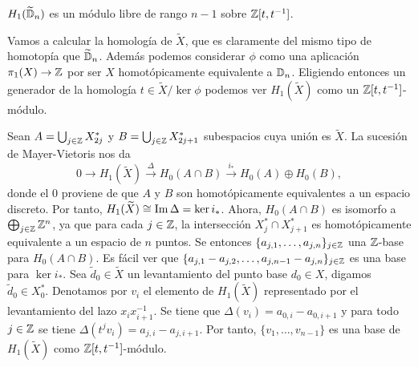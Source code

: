 \documentclass[TFG.tex]{subfiles}
\begin{document}
\begin{prop}\label{dimension}
$H_1(\widetilde{\mathbb{D}}_n)$ es un módulo libre de rango $n-1$ sobre $\mathbb{Z}[t,t^{-1}]$.
\end{prop}
\begin{dem}



Vamos a calcular la homología de $\widetilde{X}$, que es claramente del mismo tipo de homotopía que $\widetilde{\mathbb{D}}_n$. Además podemos considerar $\phi$ como una aplicación $\pi_1(X)\to\mathbb{Z}$ por ser $X$ homotópicamente equivalente a $\mathbb{D}_n$. Eligiendo entonces un generador de la homología $t\in \widetilde{X}/\ker\phi$ podemos ver $H_1(\widetilde{X})$ como un $\mathbb{Z}[t,t^{-1}]$-módulo. 

Sean $A=\bigcup_{j\in\mathbb{Z}}X_{2j}^*$ y $B=\bigcup_{j\in\mathbb{Z}}X_{2j+1}^*$ subespacios cuya unión es $\widetilde{X}$. La sucesión de Mayer-Vietoris nos da
\[
0\to H_1(\widetilde{X})\overset{\Delta}{\to} H_0(A\cap B)\overset{i_*}{\to} H_0(A)\oplus H_0(B),
\]
donde el 0 proviene de que $A$ y $B$ son homotópicamente equivalentes a un espacio discreto. Por tanto, $H_1(\widetilde{X})\cong \operatorname{Im}\Delta=\ker i_*$. Ahora, $H_0(A\cap B)$ es isomorfo a $\bigoplus_{j\in\mathbb{Z}}\mathbb{Z}^n$, ya que para cada $j\in\mathbb{Z}$, la intersección $X_j^*\cap X_{j+1}^*$ es homotópicamente equivalente a un espacio de $n$ puntos. Se entonces $\{a_{j,1},\dots, a_{j,n}\}_{j\in\mathbb{Z}}$ una $\mathbb{Z}$-base para $H_0(A\cap B)$. Es fácil ver que $\{a_{j,1}-a_{j,2},\dots,a_{j,n-1}-a_{j,n}\}_{j\in\mathbb{Z}}$ es una base para $\ker i_*$. Sea $\tilde{d}_0\in\widetilde{X}$ un levantamiento del punto base $d_0\in X$, digamos $\tilde{d}_0\in X_0^*$. Denotamos por $v_i$ el elemento de $H_1(\widetilde{X})$ representado por el levantamiento del lazo $x_ix_{i+1}^{-1}$. Se tiene que $\Delta (v_i)=a_{0,i}-a_{0,i+1}$ \cite{thesis} y para todo $j\in\mathbb{Z}$ se tiene $\Delta(t^j v_i)=a_{j,i}-a_{j,i+1}$. Por tanto, $\{v_1,\dots, v_{n-1}\}$ es una base de $H_1(\widetilde{X})$ como $\mathbb{Z}[t,t^{-1}]$-módulo. \QED
\end{dem}
\end{document}
